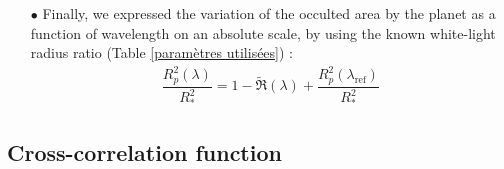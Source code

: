 \documentclass{aa}
\begin{document}
\begin{itemize}
\item[$\bullet$]Finally, we expressed the variation of the occulted area by the planet as a function of wavelength on an absolute scale, by using the known white-light radius ratio (Table \ref{paramètres utilisées}) :
\begin{eqnarray}
\dfrac{R_{p}^{2}(\lambda)}{R_{*}^{2}}=1-\tilde{\mathfrak{R}}(\lambda)+\dfrac{R_{p}^{2}(\lambda_{\mathrm{ref}})}{R_{*}^{2}}
\label{TS basic surface}
\end{eqnarray}
\end{itemize}



	\subsection{Cross-correlation function}
	
\end{document}
